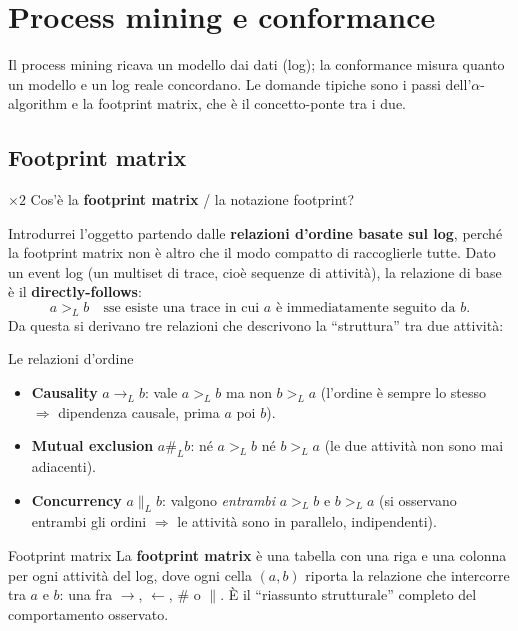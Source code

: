 \chapter{Process mining e conformance}

Il process mining ricava un modello dai dati (log); la conformance misura quanto un modello e un log reale concordano. Le domande tipiche sono i passi dell'$\alpha$-algorithm e la footprint matrix, che è il concetto-ponte tra i due.

\section{Footprint matrix}

\begin{domanda}{$\times 2$}
Cos'è la \textbf{footprint matrix} / la notazione footprint?
\end{domanda}

Introdurrei l'oggetto partendo dalle \textbf{relazioni d'ordine basate sul log}, perché la footprint matrix non è altro che il modo compatto di raccoglierle tutte. Dato un event log (un multiset di trace, cioè sequenze di attività), la relazione di base è il \textbf{directly-follows}:
$$a >_L b \quad\text{sse esiste una trace in cui } a \text{ è immediatamente seguito da } b.$$
Da questa si derivano tre relazioni che descrivono la ``struttura'' tra due attività:

\begin{definizione}{Le relazioni d'ordine}
\begin{itemize}
  \item \textbf{Causality} $a \to_L b$: vale $a >_L b$ ma non $b >_L a$ (l'ordine è sempre lo stesso $\Rightarrow$ dipendenza causale, prima $a$ poi $b$).
  \item \textbf{Mutual exclusion} $a \#_L b$: né $a >_L b$ né $b >_L a$ (le due attività non sono mai adiacenti).
  \item \textbf{Concurrency} $a \parallel_L b$: valgono \emph{entrambi} $a >_L b$ e $b >_L a$ (si osservano entrambi gli ordini $\Rightarrow$ le attività sono in parallelo, indipendenti).
\end{itemize}
\end{definizione}

\begin{definizione}{Footprint matrix}
La \textbf{footprint matrix} è una tabella con una riga e una colonna per ogni attività del log, dove ogni cella $(a,b)$ riporta la relazione che intercorre tra $a$ e $b$: una fra $\to$, $\leftarrow$, $\#$ o $\parallel$. È il ``riassunto strutturale'' completo del comportamento osservato.
\end{definizione}


